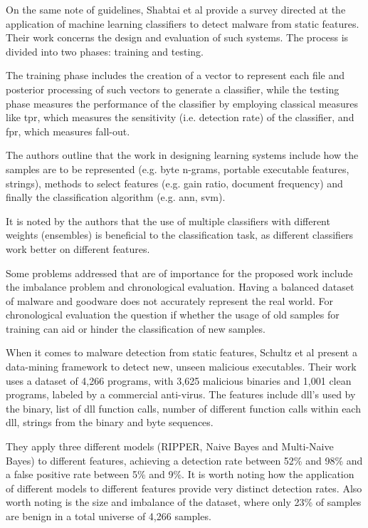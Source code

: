 \documentclass{llncs}
\begin{document}
On the same note of guidelines, Shabtai et al\cite{shabtai:survey} provide a survey directed at the application of machine learning classifiers to detect malware from static features. Their work concerns the design and evaluation of such systems. The process is divided into two phases: training and testing.

The training phase includes the creation of a vector to represent each file and posterior processing of such vectors to generate a classifier, while the testing phase measures the performance of the classifier by employing classical measures like \gls{tpr}, which measures the sensitivity (i.e. detection rate) of the classifier, and \gls{fpr}, which measures fall-out.

The authors outline that the work in designing learning systems include how the samples are to be represented (e.g. byte n-grams, portable executable features, strings), methods to select features (e.g. gain ratio, document frequency) and finally the classification algorithm (e.g. \gls{ann}, \gls{svm}).

It is noted by the authors that the use of multiple classifiers with different weights (ensembles) is beneficial to the classification task, as different classifiers work better on different features.

Some problems addressed that are of importance for the proposed work include the imbalance problem and chronological evaluation. Having a balanced dataset of malware and goodware does not accurately represent the real world. For chronological evaluation the question if whether the usage of old samples for training can aid or hinder the classification of new samples.

When it comes to malware detection from static features, Schultz et al\cite{schultz:data_mining} present a data-mining framework to detect new, unseen malicious executables. Their work uses a dataset of 4,266 programs, with 3,625 malicious binaries and 1,001 clean programs, labeled by a commercial anti-virus. The features include \gls{dll}'s used by the binary, list of \gls{dll} function calls, number of different function calls within each \gls{dll}, strings from the binary and byte sequences.

They apply three different models (RIPPER, Naive Bayes and Multi-Naive Bayes) to different features, achieving a detection rate between 52\% and 98\% and a false positive rate between 5\% and 9\%. It is worth noting how the application of different models to different features provide very distinct detection rates. Also worth noting is the size and imbalance of the dataset, where only 23\% of samples are benign in a total universe of 4,266 samples.
\end{document}
